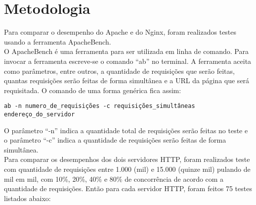 \chapter{Metodologia}\label{cap:metodologia}
Para comparar o desempenho do Apache e do Nginx, foram realizados testes usando 
a ferramenta ApacheBench.\\
O ApacheBench é uma ferramenta para ser utilizada em linha de comando. Para 
invocar a ferramenta escreve-se o comando ``ab'' no terminal. A ferramenta 
aceita como parâmetros, entre outros, a quantidade de requisições que serão 
feitas, quantas requisições serão feitas de forma simultânea e a URL da página 
que será requisitada. O comando de uma forma genérica fica assim:
\begin{verbatim}
ab -n numero_de_requisições -c requisições_simultâneas endereço_do_servidor
\end{verbatim}
O parâmetro ``-n'' indica a quantidade total de requisições serão feitas no 
teste e o parâmetro ``-c'' indica a quantidade de requisições serão feitas de 
forma simultânea.\\
Para comparar os desempenhos dos dois servidores HTTP, foram realizados teste 
com quantidade de requisições entre 1.000 (mil) e 15.000 (quinze mil) pulando 
de mil em mil, com 10\%, 20\%, 40\% e 80\% de concorrência de acordo com a 
quantidade de requisições. Então para cada servidor HTTP, foram feitos 75 
testes listados abaixo:
